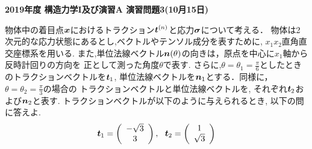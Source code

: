 \documentclass[10pt,a4j]{jarticle}
\newlength{\minitwocolumn}
\begin{document}
\newcommand{\fat}[1]{\mbox{\boldmath $#1$}}
\newcommand{\D}{\partial}
\newcommand{\w}{\omega}
\newcommand{\ga}{\alpha}
\newcommand{\gb}{\beta}
\newcommand{\gx}{\xi}
\newcommand{\gz}{\zeta}
\newcommand{\vhat}[1]{\hat{\fat{#1}}}
\newcommand{\spc}{\vspace{0.7\baselineskip}}
\newcommand{\halfspc}{\vspace{0.3\baselineskip}}

\pagestyle{empty}
\newcommand{\twofig}[2]
 {
   \begin{figure}[h]
     \begin{minipage}[t]{\minitwocolumn}
         \begin{center}   #1
         \end{center}
     \end{minipage}
         \hspace{\columnsep}
     \begin{minipage}[t]{\minitwocolumn}
         \begin{center} #2
         \end{center}
     \end{minipage}
   \end{figure}
 }
\begin{center}
{\Large \bf 2019年度 構造力学I及び演習A 演習問題3(10月15日)} \\
\end{center}
\vspace{5mm}
物体中の着目点$\fat{x}$におけるトラクション$\fat{t}^{(n)}$と応力$\fat{\sigma}$について考える．
物体は2次元的な応力状態にあるとし,ベクトルやテンソル成分を表すために, $x_1x_2$直角直交座標系を用いる.
また,単位法線ベクトル$\fat{n}(\theta)$の向きは，原点を中心に$x_1$軸から反時計回りの方向を
正として測った角度$\theta$で表す.
さらに,$\theta=\theta_1=\frac{\pi}{6}$としたときのトラクションベクトルを$\fat{t}_1$, 
単位法線ベクトルを$\fat{n}_1$とする．同様に，$\theta=\theta_2=\frac{\pi}{3}$の場合の
トラクションベクトルと単位法線ベクトルを, それぞれ$\fat{t}_2$および$\fat{n}_2$と表す. 
トラクションベクトルが以下のように与えられるとき, 以下の問に答えよ.
\[
	\fat{t}_1=
	\left(
		\begin{array}{c}
			-\sqrt{3} \\
			3
		\end{array}
	\right), \ \ 
	\fat{t}_2=
	\left(
		\begin{array}{c}
			1 \\
			\sqrt{3}
		\end{array}
	\right)
\]
\end{document}
